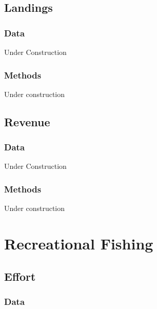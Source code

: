 \documentclass[
]{book}
\begin{document}
\hypertarget{landings}{%
\section{Landings}\label{landings}}

\hypertarget{data-15}{%
\subsection{Data}\label{data-15}}

Under Construction

\hypertarget{methods-15}{%
\subsection{Methods}\label{methods-15}}

Under construction

\hypertarget{revenue}{%
\section{Revenue}\label{revenue}}

\hypertarget{data-16}{%
\subsection{Data}\label{data-16}}

Under Construction

\hypertarget{methods-16}{%
\subsection{Methods}\label{methods-16}}

Under construction

\hypertarget{recreational-fishing}{%
\chapter{Recreational Fishing}\label{recreational-fishing}}

\hypertarget{effort}{%
\section{Effort}\label{effort}}

\hypertarget{data-17}{%
\subsection{Data}\label{data-17}}
\end{document}
